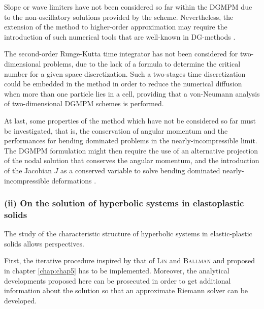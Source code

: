 Slope or wave limiters have not been considered so far within the DGMPM due to the non-oscillatory solutions provided by the scheme.
Nevertheless, the extension of the method to higher-order approximation may require the introduction of such numerical tools that are well-known in DG-methods \cite{Cockburn}.

The second-order Runge-Kutta time integrator has not been considered for two-dimensional problems, due to the lack of a formula to determine the critical  number for a given space discretization.
Such a two-stages time discretization could be embedded in the method in order to reduce the numerical diffusion when more than one particle lies in a cell, providing that a von-Neumann analysis of two-dimensional DGMPM schemes is performed.

At last, some properties of the method which have not be considered so far must be investigated, that is, the conservation of angular momentum and the performances for bending dominated problems in the nearly-incompressible limit.
The DGMPM formulation might then require the use of an alternative projection of the nodal solution that conserves the angular momentum, and the introduction of the Jacobian $J$ as a conserved variable to solve bending dominated nearly-incompressible deformations \cite{Gil_HE}.


\subsubsection*{(ii) On the solution of hyperbolic systems in elastoplastic solids}
The study of the characteristic structure of hyperbolic systems in elastic-plastic solids allows perspectives.

First, the iterative procedure inspired by that of \textsc{Lin} and \textsc{Ballman} \cite{Lin_et_Ballman} and proposed in chapter \ref{chap:chap5} has to be implemented.
Moreover, the analytical developments proposed here can be prosecuted in order to get additional information about the solution so that an approximate Riemann solver can be developed.

